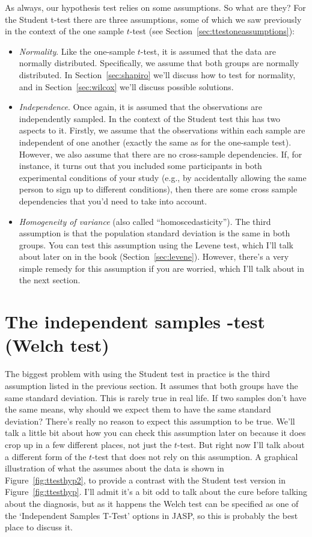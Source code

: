 As always, our hypothesis test relies on some assumptions. So what are they? For the Student t-test there are three assumptions, some of which we saw previously in the context of the one sample $t$-test (see Section~\ref{sec:ttestoneassumptions}):
\begin{itemize}
\item {\it Normality}. Like the one-sample $t$-test, it is assumed that the data are normally distributed. Specifically, we assume that both groups are normally distributed. In Section~\ref{sec:shapiro} we'll discuss how to test for normality, and in Section~\ref{sec:wilcox} we'll discuss possible solutions.
\item {\it Independence}. Once again, it is assumed that the observations are independently sampled. In the context of the Student test this has two aspects to it. Firstly, we assume that the observations within each sample are independent of one another (exactly the same as for the one-sample test). However, we also assume that there are no cross-sample dependencies. If, for instance, it turns out that you included some participants in both experimental conditions of your study (e.g., by accidentally allowing the same person to sign up to different conditions), then there are some cross sample dependencies that you'd need to take into account.
\item {\it Homogeneity of variance} (also called ``homoscedasticity''). The third assumption is that the population standard deviation is the same in both groups. You can test this assumption using the Levene test, which I'll talk about later on in the book (Section~\ref{sec:levene}). However, there's a very simple remedy for this assumption if you are worried, which I'll talk about in the next section.
\end{itemize}


\section{The independent samples \texorpdfstring{}{}-test (Welch test)~\label{sec:welchttest}}

The biggest problem with using the Student test in practice is the third assumption listed in the previous section. It assumes that both groups have the same standard deviation. This is rarely true in real life. If two samples don't have the same means, why should we expect them to have the same standard deviation? There's really no reason to expect this assumption to be true. We'll talk a little bit about how you can check this assumption later on because it does crop up in a few different places, not just the $t$-test. But right now I'll talk about a different form of the $t$-test \parencite{Welch1947} that does not rely on this assumption. A graphical illustration of what the  assumes about the data is shown in Figure~\ref{fig:ttesthyp2}, to provide a contrast with the Student test version in Figure~\ref{fig:ttesthyp}. I'll admit it's a bit odd to talk about the cure before talking about the diagnosis, but as it happens the Welch test can be specified as one of the `Independent Samples T-Test' options in JASP, so this is probably the best place to discuss it. 

